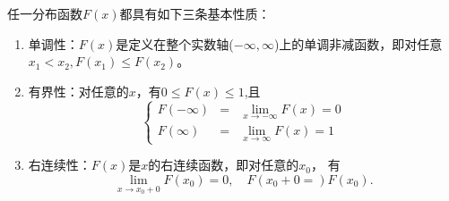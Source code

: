 \begin{property}
任一分布函数$F(x)$都具有如下三条基本性质：
\begin{enumerate}
    \item 单调性：$F(x)$是定义在整个实数轴($-\infty, \infty$)上的单调非减函数，即对任意$x_1 < x_2, F(x_1) \leq F(x_2)$。
    \item 有界性：对任意的$x$，有$0 \leq F(x) \leq 1$,且
 $$\left\{\begin{aligned}
F(-\infty)&=&\lim _{x \rightarrow-\infty} F(x)=0 \\
F(\infty)&=&\lim _{x \rightarrow \infty} F(x)=1
\end{aligned}\right.$$
    \item 右连续性：$F(x)$是$x$的右连续函数，即对任意的$x_0$，
    有
 $$\lim \limits_{x \rightarrow x_0 +0} F(x_0)=0,\quad  F(x_0 + 0=)F(x_0).$$
\end{enumerate}
\end{property}
